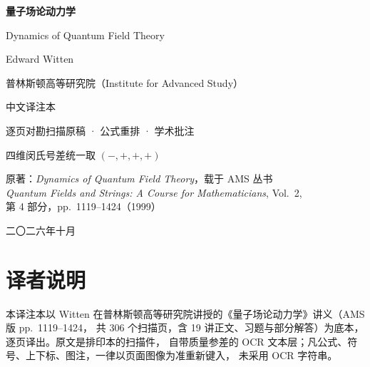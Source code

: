 \documentclass[11pt,a4paper]{article}
\theoremstyle{remark}
\theoremstyle{definition}
\theoremstyle{plain}
\begin{document}
\begin{titlepage}
  \centering
  \vspace*{2.2cm}
  {\Huge\bfseries 量子场论动力学\par}
  \vspace{0.8cm}
  {\LARGE Dynamics of Quantum Field Theory\par}
  \vspace{1.6cm}
  {\Large Edward Witten\par}
  \vspace{0.35cm}
  {\large 普林斯顿高等研究院（Institute for Advanced Study）\par}
  \vspace{2.0cm}
  {\large 中文译注本\par}
  \vspace{0.3cm}
  {\large 逐页对勘扫描原稿 · 公式重排 · 学术批注\par}
  \vspace{0.6cm}
  {\large 四维闵氏号差统一取 $(-,+,+,+)$\par}
  \vfill
  {\small 原著：\emph{Dynamics of Quantum Field Theory}，载于 AMS 丛书\\[2pt]
  \emph{Quantum Fields and Strings: A Course for Mathematicians}, Vol.~2,\\[2pt]
  第 4 部分，pp.~1119--1424（1999）\par}
  \vspace{1.2cm}
  {\small 二〇二六年十月\par}
\end{titlepage}

\section*{译者说明}

本译注本以 Witten 在普林斯顿高等研究院讲授的《量子场论动力学》讲义（AMS 版 pp.~1119--1424，
共 306 个扫描页，含 19 讲正文、习题与部分解答）为底本，逐页译出。原文是排印本的扫描件，
自带质量参差的 OCR 文本层；凡公式、符号、上下标、图注，一律以页面图像为准重新键入，
未采用 OCR 字符串。
\end{document}
